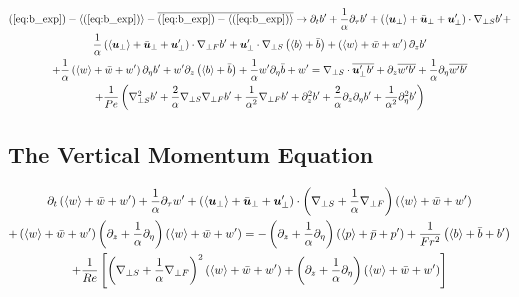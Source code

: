 \documentclass{article}
\begin{document}
\begin{multline}
    (\ref{eq:b_exp}) - \left<(\ref{eq:b_exp})\right> - \overline{(\ref{eq:b_exp}) -
    \left<(\ref{eq:b_exp})\right>} \to \partial_t b' +
    \frac{1}{\alpha}\partial_{\tau} b' + \left(\left<\boldsymbol{u}_{\perp}\right> +
    \bar{\boldsymbol{u}}_{\perp} + \boldsymbol{u}_{\perp}'\right)\cdot\nabla_{\perp S} b' +\\
    \frac{1}{\alpha}\left(\left<\boldsymbol{u}_{\perp}\right> +
    \bar{\boldsymbol{u}}_{\perp} + \boldsymbol{u}_{\perp}'\right)\cdot\nabla_{\perp F} b'
    + \boldsymbol{u}_{\perp}'\cdot\nabla_{\perp S}\left(\left<b\right> + \bar{b}\right)
    + \left(\left<w\right> + \bar{w} + w'\right)\partial_zb' \\
    + \frac{1}{\alpha}\left(\left<w\right> + \bar{w} + w'\right)\partial_{\eta}b'  +  w'\partial_z\left(\left<b\right> +
    \bar{b}\right) + \frac{1}{\alpha}w'\partial_{\eta}\bar{b}
    +w' = \nabla_{\perp S}\cdot\overline{\boldsymbol{u}_{\perp}'b'} +
    \partial_z\overline{w'b'} + \frac{1}{\alpha}\partial_{\eta}\overline{w'b'}
    \\+ \frac{1}{Pe}\left(\nabla_{\perp S}^2b' + \frac{2}{\alpha}\nabla_{\perp S}\nabla_{\perp F} b' +
    \frac{1}{\alpha^2}\nabla_{\perp F} b' + \partial_z^2b' +
    \frac{2}{\alpha}\partial_z\partial_{\eta}b' +
    \frac{1}{\alpha^2}\partial_{\eta}^2b'\right)
    \label{eq:b_pert_eq}
\end{multline}

\subsection{The Vertical Momentum Equation}

\begin{multline}
    \partial_t\left(\left<w\right> + \bar{w} + w'\right) +
    \frac{1}{\alpha}\partial_{\tau}w' + \left(\left<\boldsymbol{u}_{\perp}\right> + \bar{\boldsymbol{u}}_{\perp} + \boldsymbol{u}'_{\perp}\right)\cdot\left(\nabla_{\perp S} +
    \frac{1}{\alpha}\nabla_{\perp F}\right)\left(\left<w\right> + \bar{w} + w'\right) \\+ \left(\left<w\right> + \bar{w} + w'\right)\left(\partial_z +
    \frac{1}{\alpha}\partial_{\eta}\right)\left(\left<w\right> + \bar{w} + w'\right)  \label{eq:w_exp}
     = -\left(\partial_z + \frac{1}{\alpha}\partial_{\eta}\right)\left(\left<p\right> + \bar{p} + p'\right) +
     \frac{1}{Fr^2}\left(\left<b\right> + \bar{b} + b'\right) \\
    + \frac{1}{Re}\left[\left(\nabla_{\perp S} + \frac{1}{\alpha}\nabla_{\perp F}\right)^2
    \left(\left<w\right> + \bar{w} + w'\right) + \left(\partial_z +\frac{1}{\alpha}\partial_{\eta}\right)\left(\left<w\right> + \bar{w} + w'\right)\right]
\end{multline}
\end{document}
